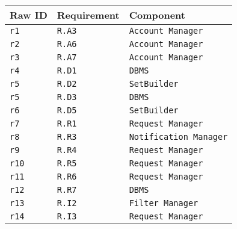 \documentclass[../DD0.tex]{subfiles}
\begin{document}
    \begin{table}[h!]

      \centering
      \begin{tabularx}{.8\linewidth}{|X|X|X|}
        \hline
        \textbf{Raw ID} & \textbf{Requirement} & \textbf{Component} \\ \hline
        \texttt{r1} & \texttt{R.A3} & \texttt{Account Manager} \\
        \hline
        \texttt{r2} & \texttt{R.A6} & \texttt{Account Manager} \\
        \hline
        \texttt{r3} & \texttt{R.A7} & \texttt{Account Manager} \\
        \hline
        \texttt{r4} & \texttt{R.D1}  & \texttt{DBMS} \\
        \hline
        \texttt{r5} & \texttt{R.D2}  & \texttt{SetBuilder} \\
        \hline
        \texttt{r5} & \texttt{R.D3}  & \texttt{DBMS} \\
        \hline
        \texttt{r6} & \texttt{R.D5}  & \texttt{SetBuilder} \\
        \hline
        \texttt{r7} & \texttt{R.R1}  & \texttt{Request Manager} \\
        \hline
        \texttt{r8} & \texttt{R.R3}  & \texttt{Notification Manager} \\
        \hline
        \texttt{r9} & \texttt{R.R4}  & \texttt{Request Manager} \\
        \hline
        \texttt{r10} & \texttt{R.R5}  & \texttt{Request Manager} \\
        \hline
        \texttt{r11} & \texttt{R.R6}  & \texttt{Request Manager} \\
        \hline 
        \texttt{r12} & \texttt{R.R7}  & \texttt{DBMS} \\
        \hline
        \texttt{r13} & \texttt{R.I2}  & \texttt{Filter Manager} \\
        \hline
        \texttt{r14} & \texttt{R.I3} & \texttt{Request Manager} \\
        \hline

        \hline
      \end{tabularx}
      \label{tab:automatedtp}

    \end{table}
\end{document}
